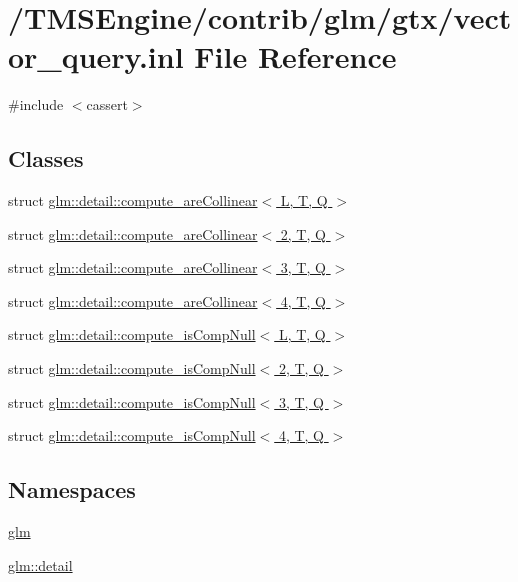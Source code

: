 \hypertarget{vector__query_8inl}{}\section{/\+T\+M\+S\+Engine/contrib/glm/gtx/vector\+\_\+query.inl File Reference}
\label{vector__query_8inl}
{\ttfamily \#include $<$cassert$>$}\newline
\subsection*{Classes}
\begin{DoxyCompactItemize}
\item 
struct \hyperlink{structglm_1_1detail_1_1compute__are_collinear}{glm\+::detail\+::compute\+\_\+are\+Collinear$<$ L, T, Q $>$}
\item 
struct \hyperlink{structglm_1_1detail_1_1compute__are_collinear_3_012_00_01_t_00_01_q_01_4}{glm\+::detail\+::compute\+\_\+are\+Collinear$<$ 2, T, Q $>$}
\item 
struct \hyperlink{structglm_1_1detail_1_1compute__are_collinear_3_013_00_01_t_00_01_q_01_4}{glm\+::detail\+::compute\+\_\+are\+Collinear$<$ 3, T, Q $>$}
\item 
struct \hyperlink{structglm_1_1detail_1_1compute__are_collinear_3_014_00_01_t_00_01_q_01_4}{glm\+::detail\+::compute\+\_\+are\+Collinear$<$ 4, T, Q $>$}
\item 
struct \hyperlink{structglm_1_1detail_1_1compute__is_comp_null}{glm\+::detail\+::compute\+\_\+is\+Comp\+Null$<$ L, T, Q $>$}
\item 
struct \hyperlink{structglm_1_1detail_1_1compute__is_comp_null_3_012_00_01_t_00_01_q_01_4}{glm\+::detail\+::compute\+\_\+is\+Comp\+Null$<$ 2, T, Q $>$}
\item 
struct \hyperlink{structglm_1_1detail_1_1compute__is_comp_null_3_013_00_01_t_00_01_q_01_4}{glm\+::detail\+::compute\+\_\+is\+Comp\+Null$<$ 3, T, Q $>$}
\item 
struct \hyperlink{structglm_1_1detail_1_1compute__is_comp_null_3_014_00_01_t_00_01_q_01_4}{glm\+::detail\+::compute\+\_\+is\+Comp\+Null$<$ 4, T, Q $>$}
\end{DoxyCompactItemize}
\subsection*{Namespaces}
\begin{DoxyCompactItemize}
\item 
 \hyperlink{namespaceglm}{glm}
\item 
 \hyperlink{namespaceglm_1_1detail}{glm\+::detail}
\end{DoxyCompactItemize}
